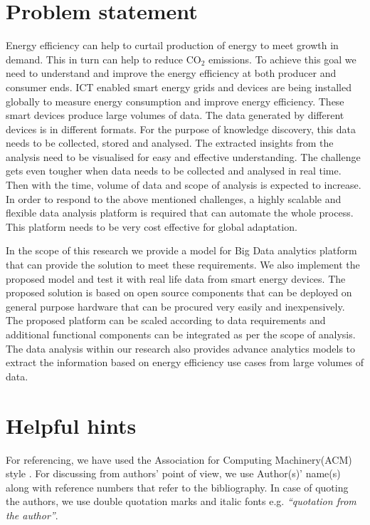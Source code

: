\section{Problem statement}

Energy efficiency can help to curtail production of energy to meet growth in demand. This in turn can help to reduce CO\(_{2}\) emissions. To achieve this goal we need to understand and improve the energy efficiency at both producer and consumer ends. ICT enabled smart energy grids and devices are being installed globally to measure energy consumption and improve energy efficiency. These smart devices produce large volumes of data. The data generated by different devices is in different formats. For the purpose of knowledge discovery, this data needs to be collected, stored and analysed. The extracted insights from the analysis need to be visualised for easy and effective understanding. The challenge gets even tougher when data needs to be collected and analysed in real time. Then with the time, volume of data and scope of analysis is expected to increase. In order to respond to the above mentioned challenges, a highly scalable and flexible data analysis platform is required that can automate the whole process. This platform needs to be very cost effective for global adaptation.
 
In the scope of this research we provide a model for Big Data analytics platform that can provide the solution to meet these requirements. We also implement the proposed model and test it with real life data from smart energy devices. The proposed solution is based on open source components that can be deployed on general purpose hardware that can be procured very easily and inexpensively. The proposed platform can be scaled according to data requirements and additional functional components can be integrated as per the scope of analysis. The data analysis within our research also provides advance analytics models to extract the information based on energy efficiency use cases from large volumes of data.


\section{Helpful hints}

For referencing, we have used the Association for Computing Machinery(ACM) style \cite{referencing}. For discussing from authors' point of view, we use Author(s)' name(s) along with reference numbers that refer to the bibliography. In case of quoting the authors, we use double quotation marks and italic fonts e.g. \emph{``quotation from the author''}.

